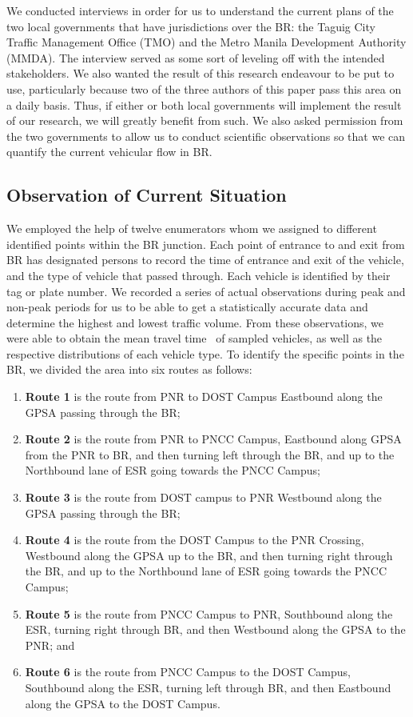 \documentclass[preprint]{./acm_proc_article-sp}
\begin{document}
We conducted interviews in order for us to understand the current plans of the two local governments that have jurisdictions over the BR: the Taguig City Traffic Management Office (TMO) and the Metro Manila Development Authority (MMDA). The interview served as some sort of leveling off with the intended stakeholders. We also wanted the result of this research endeavour to be put to use, particularly because two of the three authors of this paper pass this area on a daily basis. Thus, if either or both local governments will implement the result of our research, we will greatly benefit from such. We also asked permission from the two governments to allow us to conduct scientific observations so that we can quantify the current vehicular flow in BR.



\subsection{Observation of Current Situation}

We employed the help of twelve enumerators whom we assigned to different identified points within the BR junction.  Each point of entrance to and exit from BR has designated persons to record the time of entrance and exit of the vehicle, and the type of vehicle that passed through. Each vehicle is identified by their tag or plate number. We recorded a series of actual observations during peak and non-peak periods for us to be able to get a statistically accurate data and determine the highest and lowest traffic volume.  From these observations, we were able to obtain the mean travel time~ of sampled vehicles, as well as the respective distributions of each vehicle type. To identify the specific points in the BR, we divided the area into six routes as follows:
\begin{enumerate}
\item {\bf Route 1} is the route from PNR to DOST Campus Eastbound along the GPSA passing through the BR;
\item {\bf Route 2} is the route from PNR to PNCC Campus, Eastbound along GPSA from the PNR to BR, and then turning left through the BR, and up to the Northbound lane of ESR going towards the PNCC Campus;
\item {\bf Route 3} is the route from DOST campus to PNR Westbound along the GPSA passing through the BR;
\item {\bf Route 4} is the route from the DOST Campus to the PNR Crossing, Westbound along the GPSA up to the BR, and then turning right through the BR, and up to the Northbound lane of ESR going towards the PNCC Campus;
\item {\bf Route 5} is the route from PNCC Campus to PNR, Southbound along the ESR, turning right through BR, and then Westbound along the GPSA to the PNR; and
\item {\bf Route 6} is the route from PNCC Campus to the DOST Campus, Southbound along the ESR, turning left through BR, and then Eastbound along the GPSA to the DOST Campus.
\end{enumerate}
\end{document}
